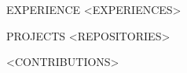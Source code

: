 \documentclass{resume} %
\begin{document}






\begin{rSection}{EXPERIENCE}
    <EXPERIENCES>
\end{rSection}



\begin{rSection}{PROJECTS}
    <REPOSITORIES>
\end{rSection}


<CONTRIBUTIONS>








\end{document}
